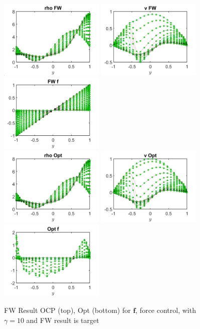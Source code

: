 \documentclass[11pt, a4paper]{article}
\theoremstyle{definition}
\newcommand{\Con}{\mathbf{f}}
\begin{document}
\begin{figure}
	\includegraphics[width=5cm]{FWrho4.png}
	\includegraphics[width=5cm]{FWv4.png}
	\includegraphics[width=5cm]{FWCont4.png}\\
	\includegraphics[width=5cm]{Optrho5.png}
	\includegraphics[width=5cm]{Optv5.png}
	\includegraphics[width=5cm]{OptCont5.png}
	\caption{FW Result OCP (top), Opt (bottom) for $\Con $, force control, with $\gamma =10$ and FW result is target}
	\label{Figure11}
\end{figure}
\end{document}
